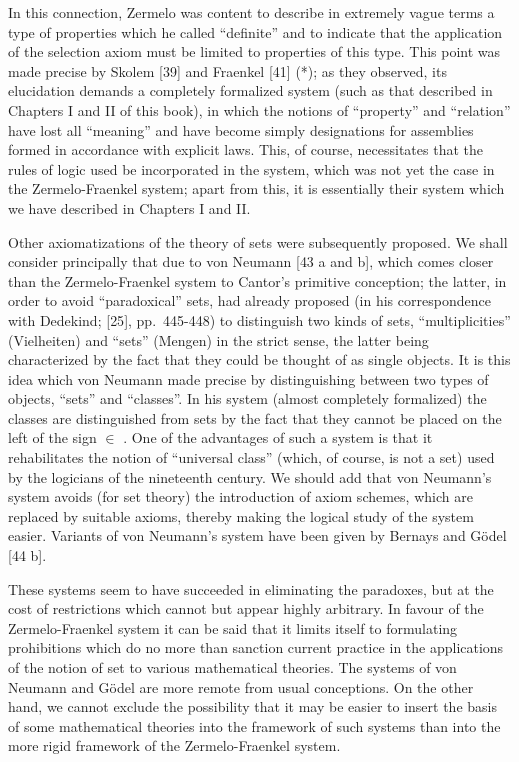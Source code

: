 In this connection, Zermelo was content to describe in extremely vague terms a type of properties which he called ``definite'' and to indicate that the application of the selection axiom must be limited to properties of this type. This point was made precise by Skolem {[}39{]} and Fraenkel {[}41{]} (*); as they observed, its elucidation demands a completely formalized system (such as that described in Chapters I and II of this book), in which the notions of ``property'' and ``relation'' have lost all ``meaning'' and have become simply designations for assemblies formed in accordance with explicit laws. This, of course, necessitates that the rules of logic used be incorporated in the system, which was not yet the case in the Zermelo-Fraenkel system; apart from this, it is essentially their system which we have described in Chapters I and II.

Other axiomatizations of the theory of sets were subsequently proposed. We shall consider principally that due to von Neumann {[}43 a and b{]}, which comes closer than the Zermelo-Fraenkel system to Cantor's primitive conception; the latter, in order to avoid ``paradoxical'' sets, had already proposed (in his correspondence with Dedekind; {[}25{]}, pp.~445-448) to distinguish two kinds of sets, ``multiplicities'' (Vielheiten) and ``sets'' (Mengen) in the strict sense, the latter being characterized by the fact that they could be thought of as single objects. It is this idea which von Neumann made precise by distinguishing between two types of objects, ``sets'' and ``classes''. In his system (almost completely formalized) the classes are distinguished from sets by the fact that they cannot be placed on the left of the sign \(\in\) . One of the advantages of such a system is that it rehabilitates the notion of ``universal class'' (which, of course, is not a set) used by the logicians of the nineteenth century. We should add that von Neumann's system avoids (for set theory) the introduction of axiom schemes, which are replaced by suitable axioms, thereby making the logical study of the system easier. Variants of von Neumann's system have been given by Bernays and Gödel {[}44 b{]}.

These systems seem to have succeeded in eliminating the paradoxes, but at the cost of restrictions which cannot but appear highly arbitrary. In favour of the Zermelo-Fraenkel system it can be said that it limits itself to formulating prohibitions which do no more than sanction current practice in the applications of the notion of set to various mathematical theories. The systems of von Neumann and Gödel are more remote from usual conceptions. On the other hand, we cannot exclude the possibility that it may be easier to insert the basis of some mathematical theories into the framework of such systems than into the more rigid framework of the Zermelo-Fraenkel system.

